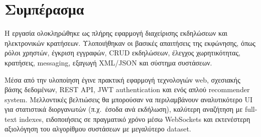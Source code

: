 \documentclass[11pt,a4paper]{article}
\begin{document}
\section{Συμπέρασμα}

Η εργασία ολοκληρώθηκε ως πλήρης εφαρμογή διαχείρισης εκδηλώσεων και ηλεκτρονικών
κρατήσεων. Υλοποιήθηκαν οι βασικές απαιτήσεις της εκφώνησης, όπως ρόλοι χρηστών,
έγκριση εγγραφών, CRUD εκδηλώσεων, έλεγχος χωρητικότητας, κρατήσεις, messaging, εξαγωγή
XML/JSON και σύστημα συστάσεων.

Μέσα από την υλοποίηση έγινε πρακτική εφαρμογή τεχνολογιών web, σχεσιακής βάσης
δεδομένων, REST API, JWT authentication και ενός απλού recommender system. Μελλοντικές
βελτιώσεις θα μπορούσαν να περιλαμβάνουν αναλυτικότερο UI για στατιστικά διοργανωτών
(π.χ.\ έσοδα ανά εκδήλωση), καλύτερη αναζήτηση με full-text indexes, ειδοποιήσεις σε
πραγματικό χρόνο μέσω WebSockets και εκτενέστερη αξιολόγηση του αλγορίθμου συστάσεων με
μεγαλύτερο dataset.
\end{document}
